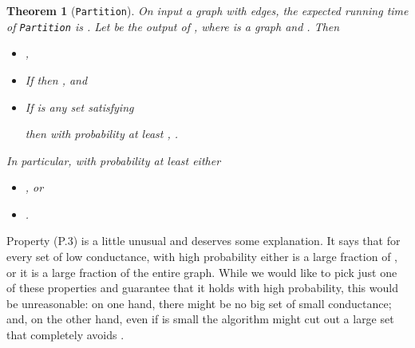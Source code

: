 \documentclass[11pt]{article}
\newtheorem{theorem}{Theorem}[section]
\begin{document}
\begin{theorem}[\texttt{Partition}]\label{thm:Partition}
On input a graph with  edges,
  the expected running time of \mbox{\rm \texttt{Partition}} is 
  .
Let  be the output of ,
  where  is a graph and .
Then
\begin{itemize}
\item [(P.1)] ,
\item [(P.2)] If  then , and
\item [(P.3)]
If  is any
  set satisfying

  then with probability at least ,
  .
\end{itemize}
In particular, with probability at least  either
\begin{itemize}
\item [(P.3.a)] , or
\item [(P.3.b)] .
\end{itemize}
\end{theorem}

Property (P.3) is a little unusual and deserves some explanation.
It says that for every set  of low conductance, with high probability
  either
   is a large fraction of , or it is a large fraction of the
  entire graph.
While we would like to pick just one of these properties and guarantee that
  it holds with high probability, this would be unreasonable:  
  on one hand, there might be no big set  of small conductance;
  and, on the other hand, even if  is small the algorithm might
  cut out a large set  that completely avoids .
\end{document}
